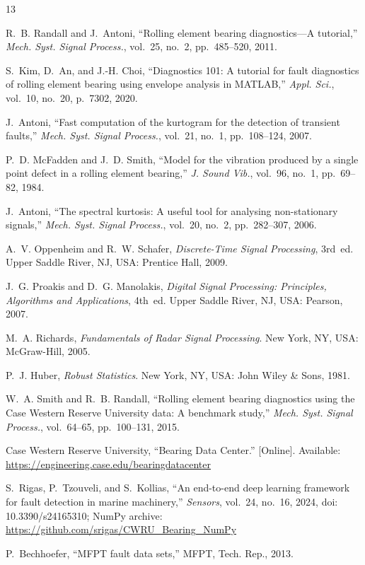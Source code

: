 \begin{thebibliography}{13}

R.~B. Randall and J.~Antoni, ``Rolling element bearing diagnostics---A
tutorial,'' \emph{Mech. Syst. Signal Process.}, vol.~25, no.~2, pp.~485--520,
2011.

S.~Kim, D.~An, and J.-H. Choi, ``Diagnostics 101: A tutorial for fault
diagnostics of rolling element bearing using envelope analysis in MATLAB,''
\emph{Appl. Sci.}, vol.~10, no.~20, p.~7302, 2020.

J.~Antoni, ``Fast computation of the kurtogram for the detection of transient
faults,'' \emph{Mech. Syst. Signal Process.}, vol.~21, no.~1, pp.~108--124,
2007.

P.~D. McFadden and J.~D. Smith, ``Model for the vibration produced by a single
point defect in a rolling element bearing,'' \emph{J. Sound Vib.}, vol.~96,
no.~1, pp.~69--82, 1984.

J.~Antoni, ``The spectral kurtosis: A useful tool for analysing
non-stationary signals,'' \emph{Mech. Syst. Signal Process.}, vol.~20, no.~2,
pp.~282--307, 2006.

A.~V. Oppenheim and R.~W. Schafer, \emph{Discrete-Time Signal Processing},
3rd~ed. Upper Saddle River, NJ, USA: Prentice Hall, 2009.

J.~G. Proakis and D.~G. Manolakis, \emph{Digital Signal Processing: Principles,
Algorithms and Applications}, 4th~ed. Upper Saddle River, NJ, USA: Pearson, 2007.

M.~A. Richards, \emph{Fundamentals of Radar Signal Processing}. New York, NY,
USA: McGraw-Hill, 2005.

P.~J. Huber, \emph{Robust Statistics}. New York, NY, USA: John Wiley \& Sons,
1981.

W.~A. Smith and R.~B. Randall, ``Rolling element bearing diagnostics using the
Case Western Reserve University data: A benchmark study,'' \emph{Mech. Syst.
Signal Process.}, vol.~64--65, pp.~100--131, 2015.

Case Western Reserve University, ``Bearing Data Center.'' [Online]. Available:
\url{https://engineering.case.edu/bearingdatacenter}

S.~Rigas, P.~Tzouveli, and S.~Kollias, ``An end-to-end deep learning framework
for fault detection in marine machinery,'' \emph{Sensors}, vol.~24, no.~16,
2024, doi: 10.3390/s24165310; NumPy archive: \url{https://github.com/srigas/CWRU_Bearing_NumPy}

P.~Bechhoefer, ``MFPT fault data sets,'' MFPT, Tech. Rep., 2013.

\end{thebibliography}
